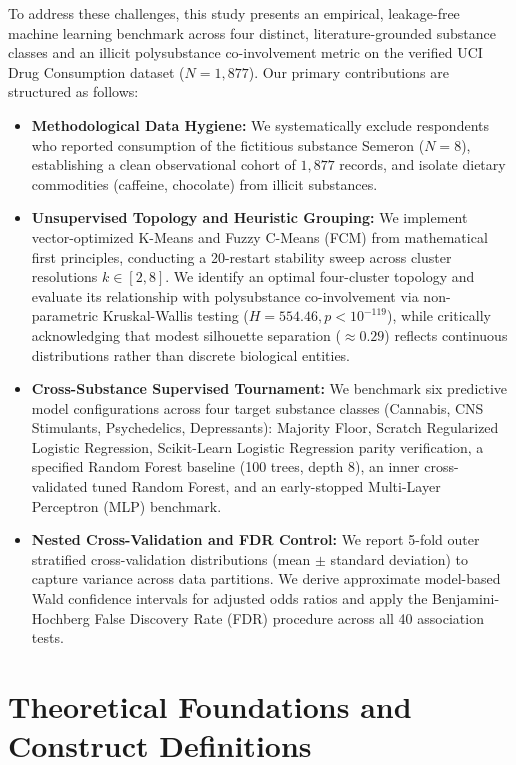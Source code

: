 \documentclass[conference]{IEEEtran}
\begin{document}
To address these challenges, this study presents an empirical, leakage-free machine learning benchmark across four distinct, literature-grounded substance classes and an illicit polysubstance co-involvement metric on the verified UCI Drug Consumption dataset ($N = 1,877$). Our primary contributions are structured as follows:
\begin{itemize}
    \item \textbf{Methodological Data Hygiene:} We systematically exclude respondents who reported consumption of the fictitious substance Semeron ($N=8$), establishing a clean observational cohort of $1,877$ records, and isolate dietary commodities (caffeine, chocolate) from illicit substances.
    \item \textbf{Unsupervised Topology and Heuristic Grouping:} We implement vector-optimized K-Means and Fuzzy C-Means (FCM) from mathematical first principles, conducting a 20-restart stability sweep across cluster resolutions $k \in [2, 8]$. We identify an optimal four-cluster topology and evaluate its relationship with polysubstance co-involvement via non-parametric Kruskal-Wallis testing ($H = 554.46, p < 10^{-119}$), while critically acknowledging that modest silhouette separation ($\approx 0.29$) reflects continuous distributions rather than discrete biological entities.
    \item \textbf{Cross-Substance Supervised Tournament:} We benchmark six predictive model configurations across four target substance classes (Cannabis, CNS Stimulants, Psychedelics, Depressants): Majority Floor, Scratch Regularized Logistic Regression, Scikit-Learn Logistic Regression parity verification, a specified Random Forest baseline (100 trees, depth 8), an inner cross-validated tuned Random Forest, and an early-stopped Multi-Layer Perceptron (MLP) benchmark.
    \item \textbf{Nested Cross-Validation and FDR Control:} We report 5-fold outer stratified cross-validation distributions (mean $\pm$ standard deviation) to capture variance across data partitions. We derive approximate model-based Wald confidence intervals for adjusted odds ratios and apply the Benjamini-Hochberg False Discovery Rate (FDR) procedure across all 40 association tests.
\end{itemize}

\section{Theoretical Foundations and Construct Definitions}
\end{document}
